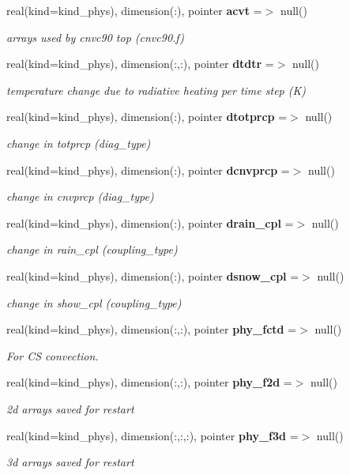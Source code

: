 \begin{DoxyCompactItemize}
real(kind=kind\+\_\+phys), dimension(\+:), pointer \textbf{ acvt} =$>$ null()
\begin{DoxyCompactList}\small\item\em arrays used by cnvc90 top (cnvc90.\+f) \end{DoxyCompactList}\item 
real(kind=kind\+\_\+phys), dimension(\+:,\+:), pointer \textbf{ dtdtr} =$>$ null()
\begin{DoxyCompactList}\small\item\em temperature change due to radiative heating per time step (K) \end{DoxyCompactList}\item 
real(kind=kind\+\_\+phys), dimension(\+:), pointer \textbf{ dtotprcp} =$>$ null()
\begin{DoxyCompactList}\small\item\em change in totprcp (diag\+\_\+type) \end{DoxyCompactList}\item 
real(kind=kind\+\_\+phys), dimension(\+:), pointer \textbf{ dcnvprcp} =$>$ null()
\begin{DoxyCompactList}\small\item\em change in cnvprcp (diag\+\_\+type) \end{DoxyCompactList}\item 
real(kind=kind\+\_\+phys), dimension(\+:), pointer \textbf{ drain\+\_\+cpl} =$>$ null()
\begin{DoxyCompactList}\small\item\em change in rain\+\_\+cpl (coupling\+\_\+type) \end{DoxyCompactList}\item 
real(kind=kind\+\_\+phys), dimension(\+:), pointer \textbf{ dsnow\+\_\+cpl} =$>$ null()
\begin{DoxyCompactList}\small\item\em change in show\+\_\+cpl (coupling\+\_\+type) \end{DoxyCompactList}\item 
real(kind=kind\+\_\+phys), dimension(\+:,\+:), pointer \textbf{ phy\+\_\+fctd} =$>$ null()
\begin{DoxyCompactList}\small\item\em For CS convection. \end{DoxyCompactList}\item 
real(kind=kind\+\_\+phys), dimension(\+:,\+:), pointer \textbf{ phy\+\_\+f2d} =$>$ null()
\begin{DoxyCompactList}\small\item\em 2d arrays saved for restart \end{DoxyCompactList}\item 
real(kind=kind\+\_\+phys), dimension(\+:,\+:,\+:), pointer \textbf{ phy\+\_\+f3d} =$>$ null()
\begin{DoxyCompactList}\small\item\em 3d arrays saved for restart \end{DoxyCompactList}\end{DoxyCompactItemize}


